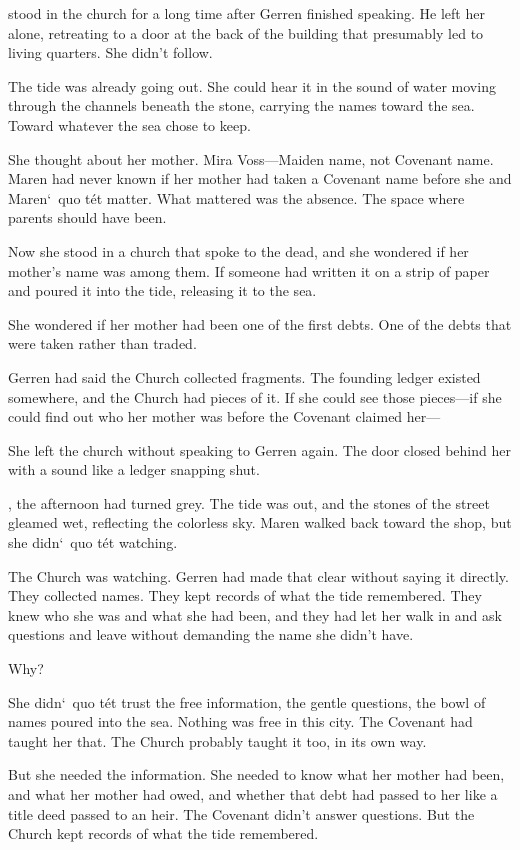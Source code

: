\documentclass[12pt,letterpaper,openany]{book}
\begin{document}
\hrulefillMaren stood in the church for a long time after Gerren finished speaking. He left her alone, retreating to a door at the back of the building that presumably led to living quarters. She didn't follow.
\par
The tide was already going out. She could hear it in the sound of water moving through the channels beneath the stone, carrying the names toward the sea. Toward whatever the sea chose to keep.
\par
She thought about her mother. Mira Voss—Maiden name, not Covenant name. Maren had never known if her mother had taken a Covenant name before she and Maren`\ quo t\'e{}t matter. What mattered was the absence. The space where parents should have been.
\par
Now she stood in a church that spoke to the dead, and she wondered if her mother's name was among them. If someone had written it on a strip of paper and poured it into the tide, releasing it to the sea.
\par
She wondered if her mother had been one of the first debts. One of the debts that were taken rather than traded.
\par
Gerren had said the Church collected fragments. The founding ledger existed somewhere, and the Church had pieces of it. If she could see those pieces—if she could find out who her mother was before the Covenant claimed her—
\par
She left the church without speaking to Gerren again. The door closed behind her with a sound like a ledger snapping shut.
\par
\hrulefillOutside, the afternoon had turned grey. The tide was out, and the stones of the street gleamed wet, reflecting the colorless sky. Maren walked back toward the shop, but she didn`\ quo t\'e{}t watching.
\par
The Church was watching. Gerren had made that clear without saying it directly. They collected names. They kept records of what the tide remembered. They knew who she was and what she had been, and they had let her walk in and ask questions and leave without demanding the name she didn't have.
\par
Why?
\par
She didn`\ quo t\'e{}t trust the free information, the gentle questions, the bowl of names poured into the sea. Nothing was free in this city. The Covenant had taught her that. The Church probably taught it too, in its own way.
\par
But she needed the information. She needed to know what her mother had been, and what her mother had owed, and whether that debt had passed to her like a title deed passed to an heir. The Covenant didn't answer questions. But the Church kept records of what the tide remembered.
\end{document}
